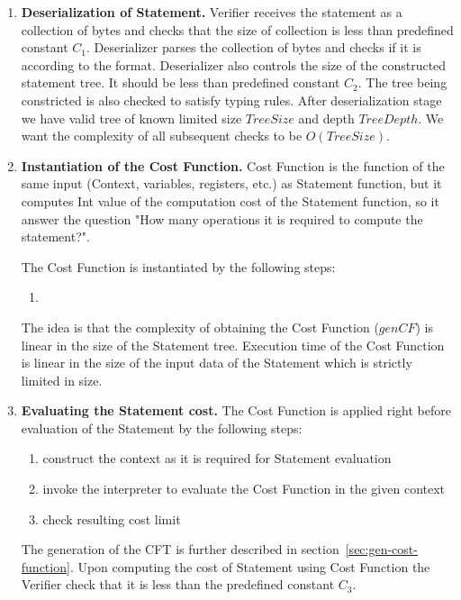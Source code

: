 \documentclass[11pt]{article}
\begin{document}
\begin{enumerate}
\item \textbf{Deserialization of Statement.}
Verifier receives the statement as a collection of bytes and checks that the
size of collection is less than predefined constant $C_1$. Deserializer parses
the collection of bytes and checks if it is according to the format.
Deserializer also controls the size of the constructed statement tree. It should
be less than predefined constant $C_2$. The tree being constricted is also
checked to satisfy typing rules. After deserialization stage we have valid tree
of known limited size $TreeSize$ and depth $TreeDepth$. We want the complexity
of all subsequent checks to be $O(TreeSize)$.

\item \textbf{Instantiation of the Cost Function.}
Cost Function is the function of the same input (Context, variables,
registers, etc.) as Statement function, but it computes Int value of the
computation cost of the Statement function, so it answer the question "How
many operations it is required to compute the statement?".

The Cost Function is instantiated by the following steps:
    \begin{enumerate}
        \item{}
    \end{enumerate}

 The idea is that the complexity of obtaining the Cost Function ($genCF$) is
 linear in the size of the Statement tree. Execution time of the Cost Function
 is linear in the size of the input data of the Statement which is strictly
 limited in size.

\item \textbf{Evaluating the Statement cost.}
The Cost Function is applied right before evaluation of the Statement by the
following steps:
    \begin{enumerate}
        \item construct the context as it is required for Statement evaluation
        \item invoke the interpreter to evaluate the Cost Function in the
        given context
        \item check resulting cost limit
    \end{enumerate}

The generation of the CFT is further described in
section~\ref{sec:gen-cost-function}. Upon computing the cost of Statement
using Cost Function the Verifier check that it is less than the predefined
constant $C_3$.
\end{enumerate}
\end{document}
